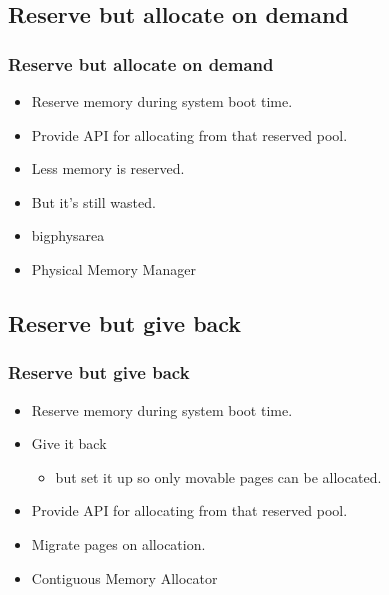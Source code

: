 \subsection{Reserve but allocate on demand}
\begin{frame}
  \frametitle{Reserve but allocate on demand}

  \begin{itemize}
  \item Reserve memory during system boot time.
  \item Provide API for allocating from that reserved pool.
  \item Less memory is reserved.
  \item But it's still wasted.
  \end{itemize}

  \begin{itemize}
  \item bigphysarea
  \item Physical Memory Manager
  \end{itemize}
\end{frame}

\subsection{Reserve but give back}
\begin{frame}
  \frametitle{Reserve but give back}

  \begin{itemize}
  \item Reserve memory during system boot time.
  \item Give it back
    \begin{itemize}
    \item but set it up so only movable pages can be allocated.
    \end{itemize}
  \item Provide API for allocating from that reserved pool.
  \item Migrate pages on allocation.
  \end{itemize}

  \begin{itemize}
  \item Contiguous Memory Allocator
  \end{itemize}
\end{frame}
